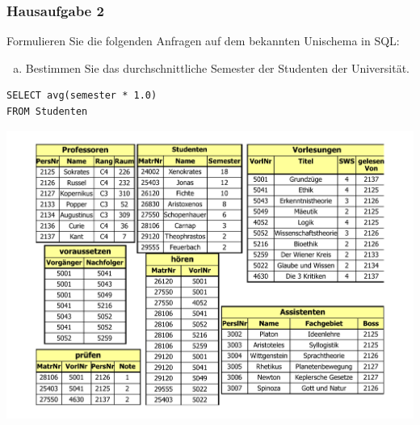 \begin{frame}[fragile]
	\frametitle{Hausaufgabe 2}
	\vspace{0.25cm}

	\begin{multicols}{2}
		Formulieren Sie die folgenden Anfragen auf dem bekannten Unischema in SQL:
		\begin{enumerate}[a)]
			\item Bestimmen Sie das durchschnittliche Semester der Studenten der Universität.
		\end{enumerate}
		\begin{verbatim}
SELECT avg(semester * 1.0) 
FROM Studenten
		\end{verbatim}
		\vfill\columnbreak

		\begin{center}
			\includegraphics[height=.6\paperheight]{../img/uni.pdf}
		\end{center}
	\end{multicols}
\end{frame}

